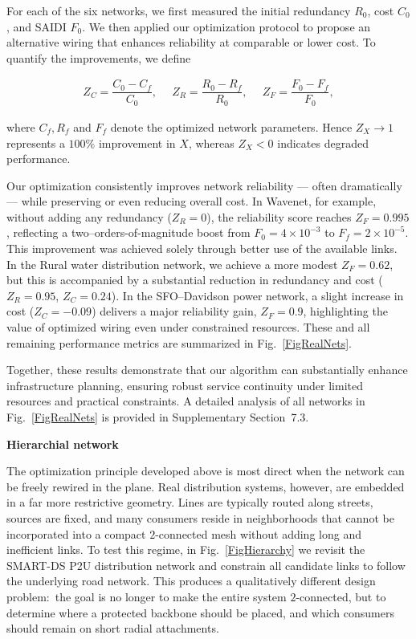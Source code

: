 \documentclass[oneside, a4paper, onecolumn, 11pt]{article}
\begin{document}
\begin{refsection}
For each of the six networks, we first measured the initial redundancy $R_0$, cost $C_0$, and SAIDI $F_0$. We then applied our optimization protocol to propose an alternative wiring that enhances reliability at comparable or lower cost. To quantify the improvements, we define

\begin{equation}
\begin{array}{ccc}
Z_C = \dfrac{C_0 - C_f}{C_0}, \,\,\, & Z_R = \dfrac{R_0 - R_f}{R_0}, \,\,\, & Z_F = \dfrac{F_0 - F_f}{F_0},
\end{array}
\label{ZCZRZF}
\end{equation}

where $C_f,R_f$ and $F_f$ denote the optimized network parameters. Hence $Z_X \to 1$ represents a $100\%$ improvement in $X$, whereas $Z_X < 0$ indicates degraded performance. 

Our optimization consistently improves network reliability — often dramatically — while preserving or even reducing overall cost. In Wavenet, for example, without adding any redundancy ($Z_R = 0$), the reliability score reaches $Z_F = 0.995$, reflecting a two–orders-of-magnitude boost from $F_0 = 4 \times 10^{-3}$ to $F_f = 2 \times 10^{-5}$. This improvement was achieved solely through better use of the available links. In the Rural water distribution network, we achieve a more modest $Z_F = 0.62$, but this is accompanied by a substantial reduction in redundancy and cost ($Z_R = 0.95$, $Z_C = 0.24$). In the SFO–Davidson power network, a slight increase in cost ($Z_C = -0.09$) delivers a major reliability gain, $Z_F = 0.9$, highlighting the value of optimized wiring even under constrained resources. These and all remaining performance metrics are summarized in Fig.~\ref{FigRealNets}. 

Together, these results demonstrate that our algorithm can substantially enhance infrastructure planning, ensuring robust service continuity under limited resources and practical constraints. A detailed analysis of all networks in Fig.~\ref{FigRealNets} is provided in Supplementary Section~7.3.


\textbf{\color{blue} \Large Hierarchial network}

The optimization principle developed above is most direct when the network can be freely rewired in the plane. Real distribution systems, however, are embedded in a far more restrictive geometry. Lines are typically routed along streets, sources are fixed, and many consumers reside in neighborhoods that cannot be incorporated into a compact $2$-connected mesh without adding long and inefficient links. To test this regime, in Fig.~\ref{FigHierarchy} we revisit the SMART-DS P2U distribution network and constrain all candidate links to follow the underlying road network. This produces a qualitatively different design problem:\ the goal is no longer to make the entire system $2$-connected, but to determine where a protected backbone should be placed, and which consumers should remain on short radial attachments.


\end{refsection}
\end{document}
